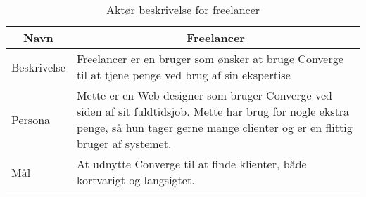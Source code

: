 \begin{table}[H]
    \begin{small}
        \caption{Aktør beskrivelse for freelancer}
        \label{tab:freelancer}
        \begin{center}
            \begin{tabular}[c]{l|l}
                \multicolumn{1}{c|}{\textbf{Navn}} & \multicolumn{1}{c}{\textbf{Freelancer}}                                                                                                                                                                            \\
                \hline
                Beskrivelse                        & \multicolumn{1}{p{10cm}}{Freelancer er en bruger som ønsker at bruge Converge til at tjene penge ved brug af sin ekspertise}                                                                                       \\
                \hline
                Persona                            & \multicolumn{1}{p{10cm}}{Mette er en Web designer som bruger Converge ved siden af sit fuldtidsjob. Mette har brug for nogle ekstra penge, så hun tager gerne mange clienter og er en flittig bruger af systemet.} \\
                \hline
                Mål                                & \multicolumn{1}{p{10cm}}{At udnytte Converge til at finde klienter, både kortvarigt og langsigtet.}                                                                                                                \\
            \end{tabular}
        \end{center}
    \end{small}
\end{table}

